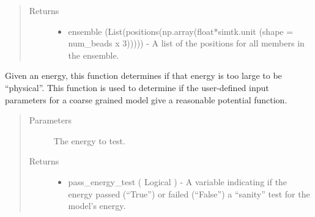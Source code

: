 \documentclass[letterpaper,12pt,english,openany,oneside]{sphinxmanual}
\begin{document}
\begin{fulllineitems}
\begin{quote}
\begin{description}
\begin{itemize}
\end{itemize}

\item[{Returns}] \leavevmode
\begin{itemize}
\item {} 
ensemble (List(positions(np.array(float*simtk.unit (shape = num\_beads x 3))))) - A list of the positions for all members in the ensemble.

\end{itemize}


\end{description}\end{quote}

\end{fulllineitems}


\begin{fulllineitems}
\label{\detokenize{ensembles:ensembles.ens_build.test_energy}}
Given an energy, this function determines if that energy is too large to be “physical”.  This function is used to determine if the user-defined input parameters for a coarse grained model give a reasonable potential function.
\begin{quote}\begin{description}
\item[{Parameters}] \leavevmode
{} \textendash{} The energy to test.

\item[{Returns}] \leavevmode
\begin{itemize}
\item {} 
pass\_energy\_test ( Logical ) - A variable indicating if the energy passed (“True”) or failed (“False”) a “sanity” test for the model’s energy.

\end{itemize}


\end{description}\end{quote}

\end{fulllineitems}

\end{document}
